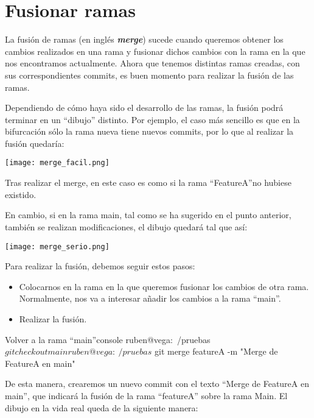 \chapter{Fusionar ramas}

La fusión de ramas (en inglés \textit{\textbf{merge}}) sucede cuando queremos obtener los cambios realizados en una rama y fusionar dichos cambios con la rama en la que nos encontramos actualmente.  Ahora que tenemos distintas ramas creadas, con sus correspondientes commits, es buen momento para realizar la fusión de las ramas.

Dependiendo de cómo haya sido el desarrollo de las ramas, la fusión podrá terminar en un “dibujo” distinto. Por ejemplo, el caso más sencillo es que en la bifurcación sólo la rama nueva tiene nuevos commits, por lo que al realizar la fusión quedaría:


\begin{center}
    \texttt{[image: merge\_facil.png]}
\end{center}

Tras realizar el merge, en este caso es como si la rama “FeatureA”no hubiese existido.

En cambio, si en la rama main, tal como se ha sugerido en el punto anterior, también se realizan modificaciones, el dibujo quedará tal que así:

\begin{center}
    \texttt{[image: merge\_serio.png]}
\end{center}


Para realizar la fusión, debemos seguir estos pasos:
\begin{itemize}
    \item Colocarnos en la rama en la que queremos fusionar los cambios de otra rama. Normalmente, nos va a interesar añadir los cambios a la rama “main”.
    \item Realizar la fusión.
\end{itemize}


\begin{mycode}{Volver a la rama “main”}{console}{}
ruben@vega:~/pruebas$ git checkout main
ruben@vega:~/pruebas$ git merge featureA -m "Merge de FeatureA en main"
\end{mycode}

De esta manera, crearemos un nuevo commit con el texto “Merge de FeatureA en main”, que indicará la fusión de la rama “featureA” sobre la rama Main. El dibujo en la vida real queda de la siguiente manera:



